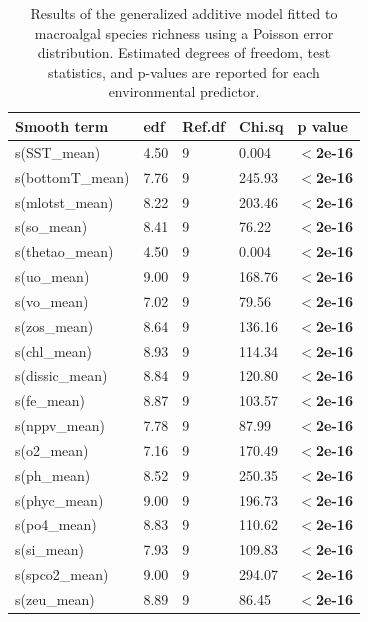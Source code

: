 \documentclass[a4paper,fleqn]{cas-sc}
\begin{document}
\begin{table}[width=\linewidth,cols=5,pos=h]
\caption{Results of the generalized additive model fitted to macroalgal species richness using a Poisson error distribution. Estimated degrees of freedom, test statistics, and p-values are reported for each environmental predictor.}
\small
\begin{tabular*}{\tblwidth}{@{} LLLLL @{}}
\toprule
\textbf{Smooth term} & \textbf{edf} & \textbf{Ref.df} & \textbf{Chi.sq} & \textbf{p value} \\
\midrule
s(SST\_mean)      & 4.50 & 9 & 0.004  & \textbf{$<$2e-16} \\
s(bottomT\_mean) & 7.76 & 9 & 245.93 & \textbf{$<$2e-16} \\
s(mlotst\_mean)   & 8.22 & 9 & 203.46 & \textbf{$<$2e-16} \\
s(so\_mean)       & 8.41 & 9 & 76.22  & \textbf{$<$2e-16} \\
s(thetao\_mean)   & 4.50 & 9 & 0.004  & \textbf{$<$2e-16} \\
s(uo\_mean)       & 9.00 & 9 & 168.76 & \textbf{$<$2e-16} \\
s(vo\_mean)       & 7.02 & 9 & 79.56  & \textbf{$<$2e-16} \\
s(zos\_mean)      & 8.64 & 9 & 136.16 & \textbf{$<$2e-16} \\
s(chl\_mean)      & 8.93 & 9 & 114.34 & \textbf{$<$2e-16} \\
s(dissic\_mean)   & 8.84 & 9 & 120.80 & \textbf{$<$2e-16} \\
s(fe\_mean)       & 8.87 & 9 & 103.57 & \textbf{$<$2e-16} \\
s(nppv\_mean)     & 7.78 & 9 & 87.99  & \textbf{$<$2e-16} \\
s(o2\_mean)       & 7.16 & 9 & 170.49 & \textbf{$<$2e-16} \\
s(ph\_mean)       & 8.52 & 9 & 250.35 & \textbf{$<$2e-16} \\
s(phyc\_mean)     & 9.00 & 9 & 196.73 & \textbf{$<$2e-16} \\
s(po4\_mean)      & 8.83 & 9 & 110.62 & \textbf{$<$2e-16} \\
s(si\_mean)       & 7.93 & 9 & 109.83 & \textbf{$<$2e-16} \\
s(spco2\_mean)    & 9.00 & 9 & 294.07 & \textbf{$<$2e-16} \\
s(zeu\_mean)      & 8.89 & 9 & 86.45  & \textbf{$<$2e-16} \\
\bottomrule
\end{tabular*}
\label{tab:8}
\end{table}
\FloatBarrier
\end{document}
